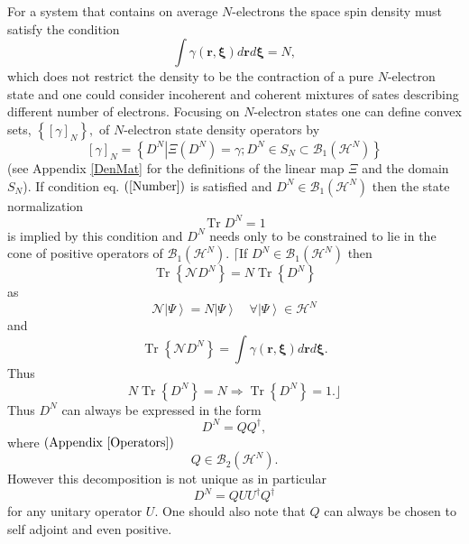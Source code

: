 \documentclass[aps,preprint]{revtex4}%
\begin{document}
For a system that contains on average $N$-electrons the space spin density
must satisfy the condition
\begin{equation}
\int\gamma\left(  \mathbf{r,\xi}\right)  d\mathbf{r}d\mathbf{\xi}=N,
\label{Number}%
\end{equation}
which does not restrict the density to be the contraction of a pure
$N$-electron state and one could consider incoherent and coherent mixtures of
sates describing different number of electrons. Focusing on $N$-electron
states one can define convex sets, $\left\{  \left[  \gamma\right]
_{N}\right\}  ,$ of $N$-electron state density operators by
\begin{equation}
\left[  \gamma\right]  _{N}=\left\{  \left.  D^{N}\right\vert \Xi\left(
D^{N}\right)  =\gamma;D^{N}\in S_{N}\subset\mathcal{B}_{1}\left(
\mathcal{H}^{N}\right)  \right\}
\end{equation}
(see Appendix \ref{DenMat} for the definitions of the linear map $\Xi$ and the
domain $S_{N}$). If condition eq. $\left(  \ref{Number}\right)  $ is satisfied
and $D^{N}\in\mathcal{B}_{1}\left(  \mathcal{H}^{N}\right)  $ then the state
normalization
\begin{equation}
\operatorname{Tr}D^{N}=1
\end{equation}
is implied by this condition and $D^{N}$ needs only to be constrained to lie
in the cone of positive operators of $\mathcal{B}_{1}\left(  \mathcal{H}%
^{N}\right)  $. $\lceil$If $D^{N}\in\mathcal{B}_{1}\left(  \mathcal{H}%
^{N}\right)  $ then
\begin{equation}
\operatorname{Tr}\left\{  \mathcal{N}D^{N}\right\}  =N\operatorname{Tr}%
\left\{  D^{N}\right\}
\end{equation}
as
\begin{equation}
\mathcal{N}\left\vert \Psi\right\rangle =N\left\vert \Psi\right\rangle
\quad\forall\left\vert \Psi\right\rangle \in\mathcal{H}^{N}%
\end{equation}
and
\begin{equation}
\operatorname{Tr}\left\{  \mathcal{N}D^{N}\right\}  =\int\gamma\left(
\mathbf{r,\xi}\right)  d\mathbf{r}d\mathbf{\xi.}%
\end{equation}
Thus
\begin{equation}
N\operatorname{Tr}\left\{  D^{N}\right\}  =N\Rightarrow\operatorname{Tr}%
\left\{  D^{N}\right\}  =1.\rfloor
\end{equation}
Thus $D^{N}$ can always be expressed in the form
\begin{equation}
D^{N}=QQ^{\dagger},
\end{equation}
where $\left(  \text{Appendix \ref{Operators}}\right)  $
\begin{equation}
Q\in\mathcal{B}_{2}\left(  \mathcal{H}^{N}\right)  .
\end{equation}
However this decomposition is not unique as in particular
\begin{equation}
D^{N}=QUU^{\dagger}Q^{\dagger}%
\end{equation}
for any unitary operator $U$. One should also note that $Q$ can always be
chosen to self adjoint and even positive.
\end{document}
